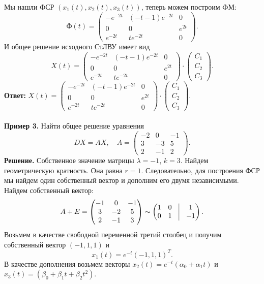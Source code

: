 \documentclass[a4paper, 12pt]{article}
\newcommand{\FI}{\text{Ф}}
\begin{document}
Мы нашли ФСР $(x_1(t), x_2(t), x_3(t))$, теперь можем построим ФМ:
$$\FI(t) = \begin{pmatrix}
	-e^{-2t} & (-t-1)e^{-2t} & 0\\
	0 & 0 & e^{2t}\\
	e^{-2t} & te^{-2t} & 0
\end{pmatrix}.$$
И общее решение исходного СтЛВУ имеет вид
$$X(t) = \begin{pmatrix}
	-e^{-2t} & (-t-1)e^{-2t} & 0\\
	0 & 0 & e^{2t}\\
	e^{-2t} & te^{-2t} & 0
\end{pmatrix} \cdot \begin{pmatrix}
C_1\\C_2\\C_3
\end{pmatrix}.$$
\textbf{Ответ:} $X(t) = \begin{pmatrix}
	-e^{-2t} & (-t-1)e^{-2t} & 0\\
	0 & 0 & e^{2t}\\
	e^{-2t} & te^{-2t} & 0
\end{pmatrix} \cdot \begin{pmatrix}
	C_1\\C_2\\C_3
\end{pmatrix}.$\\\\
\textbf{Пример 3.} Найти общее решение уравнения $$DX = AX, \quad A = \begin{pmatrix}
	-2 & 0 & -1\\
	3 & -3 & 5\\
	2 & -1 & 2
\end{pmatrix}.$$
\textbf{Решение.} Собственное значение матрицы $\lambda = -1$, $k = 3$. Найдем геометрическую кратность. Она равна $r = 1$. Следовательно, для построения ФСР мы найдем один собственный вектор и дополним его двумя независимыми. Найдем собственный вектор:
$$A + E = \begin{pmatrix}
	-1 & 0 & -1\\
	3 & -2 & 5\\
	2 & -1 & 3
\end{pmatrix}\sim \begin{pmatrix}
1 & 0 & \vline & 1\\
0 & 1 & \vline & -1
\end{pmatrix}.$$
Возьмем в качестве свободной переменной третий столбец и получим собственный вектор $(-1, 1, 1)$ и $$x_1(t) = e^{-t}(-1, 1, 1)^T.$$
В качестве дополнения возьмем векторы $x_2(t) = e^{-t}(\alpha_0 + \alpha_1t)$ и $x_3(t) = (\beta_0 + \beta_1t + \beta_2t^2)$.\\
\end{document}
